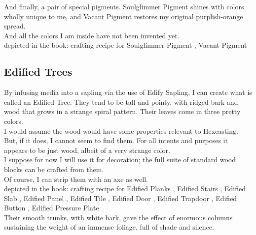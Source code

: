 \documentclass[12pt]{article}
\begin{document}
      



  
    And finally, a pair of special pigments. Soulglimmer Pigment shines with colors wholly unique to me, and Vacant Pigment restores my original purplish-orange spread.\\And all the colors I am inside have not been invented yet.\\


  
  depicted in the book: crafting recipe for 
    Soulglimmer Pigment
,     Vacant Pigment
\\

      


\newpage

\label{sec:items/edified}
\subsection*{Edified Trees}


  
    By infusing media into a sapling via the use of Edify Sapling, I can create what is called an Edified Tree. They tend to be tall and pointy, with ridged bark and wood that grows in a strange spiral pattern. Their leaves come in three pretty colors.\\


  
    I would assume the wood would have some properties relevant to Hexcasting. But, if it does, I cannot seem to find them. For all intents and purposes it appears to be just wood, albeit of a very strange color.\\I suppose for now I will use it for decoration; the full suite of standard wood blocks can be crafted from them.\\Of course, I can strip them with an axe as well.\\


  
  depicted in the book: crafting recipe for 
    Edified Planks
,     Edified Stairs
,     Edified Slab
,     Edified Panel
,     Edified Tile
,     Edified Door
,     Edified Trapdoor
,     Edified Button
,     Edified Pressure Plate
\\

      



  
    Their smooth trunks, with white bark, gave the effect of enormous columns sustaining the weight of an immense foliage, full of shade and silence.\\
\end{document}

